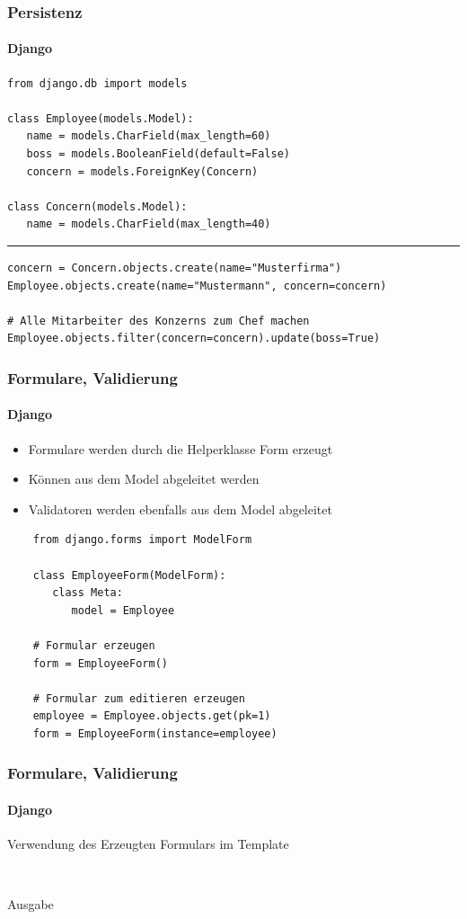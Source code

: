 \documentclass[
    t,
    smaller,
    compress,
    xcolor=svgnames,            %
    table,
]{beamer}
\begin{document}
\begin{frame}[fragile]
  \frametitle{Persistenz}
  \framesubtitle{Django}

  \vspace{-8pt}
\begin{lstlisting}
from django.db import models

class Employee(models.Model):
   name = models.CharField(max_length=60)
   boss = models.BooleanField(default=False)
   concern = models.ForeignKey(Concern)

class Concern(models.Model):
   name = models.CharField(max_length=40)
\end{lstlisting}
\hrule
\begin{lstlisting}
concern = Concern.objects.create(name="Musterfirma")
Employee.objects.create(name="Mustermann", concern=concern)

# Alle Mitarbeiter des Konzerns zum Chef machen
Employee.objects.filter(concern=concern).update(boss=True)
\end{lstlisting}

\end{frame}

\begin{frame}[fragile]
  \frametitle{Formulare, Validierung}
  \framesubtitle{Django}
  \begin{itemize}[<1->]
     \item Formulare werden durch die Helperklasse Form erzeugt
     \item Können aus dem Model abgeleitet werden
     \item Validatoren werden ebenfalls aus dem Model abgeleitet
  \end{itemize}
  \begin{lstlisting}
    from django.forms import ModelForm

    class EmployeeForm(ModelForm):
       class Meta:
          model = Employee

    # Formular erzeugen
    form = EmployeeForm()

    # Formular zum editieren erzeugen
    employee = Employee.objects.get(pk=1)
    form = EmployeeForm(instance=employee)
  \end{lstlisting}

\end{frame}

\begin{frame}[fragile]
  \frametitle{Formulare, Validierung}
  \framesubtitle{Django}
  Verwendung des Erzeugten Formulars im Template
  \begin{lstlisting}
   
  \end{lstlisting}
  Ausgabe

\end{frame}
\end{document}
